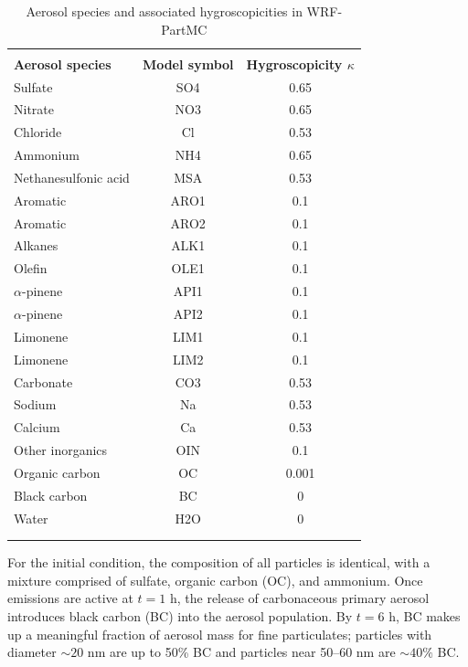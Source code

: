 \begin{table}[!t]
\centering
\caption{Aerosol species and associated hygroscopicities in WRF-PartMC}
\begin{tabular*}{.6\linewidth}{@{\extracolsep{\fill}} lcc}
\\[-2ex]\hline 
     \hline \\[-2ex] \textbf{Aerosol species} & \textbf{Model symbol} & \textbf{Hygroscopicity $\kappa$} \\
\midrule
Sulfate & SO4 & 0.65 \\
Nitrate & NO3 & 0.65 \\
Chloride & Cl & 0.53 \\
Ammonium & NH4 & 0.65 \\
Nethanesulfonic acid & MSA & 0.53 \\
Aromatic & ARO1 & 0.1 \\
Aromatic & ARO2 & 0.1 \\
Alkanes & ALK1 & 0.1 \\
Olefin & OLE1 & 0.1 \\
$\alpha$-pinene & API1 & 0.1 \\
$\alpha$-pinene & API2 & 0.1 \\
Limonene & LIM1 & 0.1 \\
Limonene & LIM2 & 0.1 \\
Carbonate & CO3 & 0.53 \\
Sodium & Na & 0.53 \\
Calcium & Ca & 0.53 \\
Other inorganics & OIN & 0.1 \\
Organic carbon & OC & 0.001 \\
Black carbon & BC & 0 \\
Water & H2O & 0 \\
\\[-2ex]\hline 
     \hline \\[-2ex]
\end{tabular*}
\label{table:wrf-partmc-species}
\end{table}

For the initial condition, the composition of all particles is identical, with a mixture comprised of sulfate, organic carbon (OC), and ammonium. Once emissions are active at $t=1$ h, the release of carbonaceous primary aerosol introduces black carbon (BC) into the aerosol population.  By $t=6$ h, BC makes up a meaningful fraction of aerosol mass for fine particulates; particles with diameter $\sim20$ nm are up to 50\% BC and particles near 50--60 nm are $\sim40\%$ BC.


